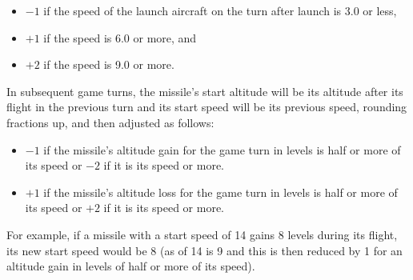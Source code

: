 {\begin{itemize}

    \item $-1$ if the speed of the launch aircraft on the turn after launch is 3.0 or less,

    \item $+1$ if the speed is 6.0 or more, and

    \item $+2$ if the speed is 9.0 or more.
\end{itemize}

In subsequent game turns, the missile's start altitude will be its altitude after its flight in the previous turn and its start speed will be {\twothirds} its previous speed, rounding fractions up, and then adjusted as follows:

\begin{itemize}

    \item $-1$ if the missile's altitude gain for the game turn in levels is half or more of its speed or $-2$ if it is its speed or more.

    \item $+1$ if the missile's altitude loss for the game turn in levels is half or more of its speed or $+2$ if it is its speed or more.

\end{itemize}

For example, if a missile with a start speed of 14 gains 8 levels during its flight, its new start speed would be 8 (as { \twothirds} of 14 is 9 and this is then reduced by 1 for an altitude gain in levels of half or more of its speed).
}

